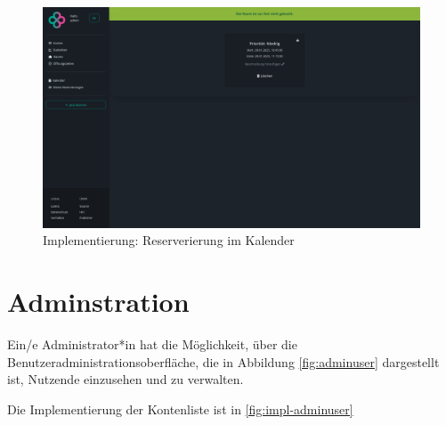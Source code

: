 \begin{figure}
    \centering
    \includegraphics[width=\textwidth]{figures/impl-views/bookings_single}
    \caption{Implementierung: Reserverierung im Kalender}
    \label{fig:impl-calendarviewbooking}
\end{figure}
\clearpage


\section{Adminstration}
Ein/e Administrator*in hat die Möglichkeit, über die Benutzeradministrationsoberfläche, die in Abbildung \ref{fig:adminuser} dargestellt ist, Nutzende einzusehen und zu verwalten.

Die Implementierung der Kontenliste ist in \ref{fig:impl-adminuser}

